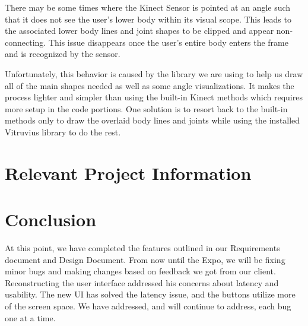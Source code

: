 \documentclass[onecolumn, draftclsnofoot,10pt, compsoc]{IEEEtran}
\begin{document}
There may be some times where the Kinect Sensor is pointed at an angle such that it does not see the user's lower body within its visual scope. This leads to the associated lower body lines and joint shapes to be clipped and appear non-connecting. This issue disappears once the user's entire body enters the frame and is recognized by the sensor. 

Unfortunately, this behavior is caused by the library we are using to help us draw all of the main shapes needed as well as some angle visualizations. It makes the process lighter and simpler than using the built-in Kinect methods which requires more setup in the code portions. One solution is to resort back to the built-in methods only to draw the overlaid body lines and joints while using the installed Vitruvius library to do the rest\cite{Vitruvius}.
\section{Relevant Project Information}


\section{Conclusion}
At this point, we have completed the features outlined in our Requirements document and Design Document. From now until the Expo, we will be fixing minor bugs and making changes based on feedback we got from our client. Reconstructing the user interface addressed his concerns about latency and usability. The new UI has solved the latency issue, and the buttons utilize more of the screen space. We have addressed, and will continue to address, each bug one at a time.

\newpage


\end{document}
